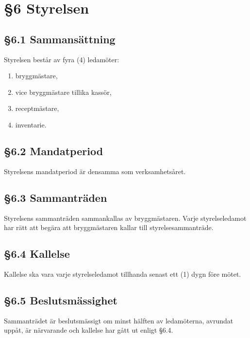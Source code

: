 \section*{\S6 Styrelsen}

\subsection*{\S6.1 Sammansättning}
{}

Styrelsen består av fyra (4) ledamöter:
\begin{enumerate}[label=\roman*)]
	\item bryggmästare,
	\item vice bryggmästare tillika kassör,
	\item receptmästare,
	\item inventarie.
\end{enumerate}

\subsection*{\S6.2 Mandatperiod}

Styrelsens mandatperiod är densamma som verksamhetsåret.

\subsection*{\S6.3 Sammanträden}

Styrelsens sammanträden sammankallas av bryggmästaren. Varje styrelseledamot har
rätt att begära att bryggmästaren kallar till styrelsesammanträde.

\subsection*{\S6.4 Kallelse}

Kallelse ska vara varje styrelseledamot tillhanda senast ett (1) dygn före mötet.

\subsection*{\S6.5 Beslutsmässighet}

Sammanträdet är beslutsmässigt om minst hälften av ledamöterna, avrundat uppåt,
är närvarande och kallelse har gått ut enligt \S6.4.
